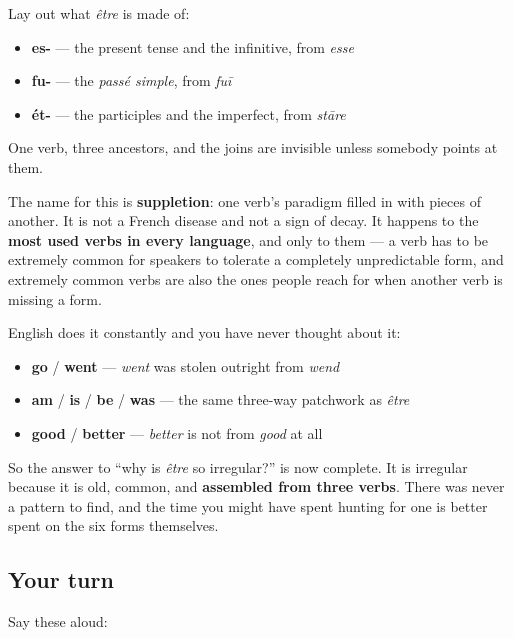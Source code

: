 \begin{grammarlens}[title={Grammar Lens: a paradigm filled in from elsewhere}]
Lay out what \emph{être} is made of:

\begin{itemize}
\raggedright
  \item \textbf{es-} — the present tense and the infinitive, from \emph{esse}
  \item \textbf{fu-} — the \emph{passé simple}, from \emph{fuī}
  \item \textbf{ét-} — the participles and the imperfect, from \emph{stāre}
\end{itemize}

One verb, three ancestors, and the joins are invisible unless somebody points at them.

The name for this is \textbf{suppletion}: one verb's paradigm filled in with pieces of another. It is not a French disease and not a sign of decay. It happens to the \textbf{most used verbs in every language}, and only to them — a verb has to be extremely common for speakers to tolerate a completely unpredictable form, and extremely common verbs are also the ones people reach for when another verb is missing a form.

English does it constantly and you have never thought about it:

\begin{itemize}
\raggedright
  \item \textbf{go} / \textbf{went} — \emph{went} was stolen outright from \emph{wend}
  \item \textbf{am} / \textbf{is} / \textbf{be} / \textbf{was} — the same three-way patchwork as \emph{être}
  \item \textbf{good} / \textbf{better} — \emph{better} is not from \emph{good} at all
\end{itemize}

So the answer to \textquotedblleft{}why is \emph{être} so irregular?\textquotedblright{} is now complete. It is irregular because it is old, common, and \textbf{assembled from three verbs}. There was never a pattern to find, and the time you might have spent hunting for one is better spent on the six forms themselves.
\end{grammarlens}

\subsection*{Your turn}
Say these aloud:

